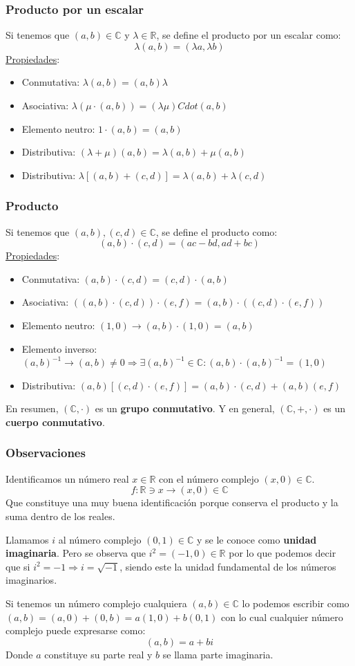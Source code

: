 \documentclass[10pt,a4paper,openright]{book}
\theoremstyle{break}
\begin{document}
\subsubsection{Producto por un escalar}
Si tenemos que $(a,b)\in \mathbb C$ y $\lambda\in \mathbb R$, se define el producto por un escalar como:
$$\lambda(a,b)=(\lambda a,\lambda b)$$
\underline{Propiedades}:
\begin{itemize}
\item Conmutativa: $\lambda(a,b)=(a,b)\lambda$
\item Asociativa: $\lambda(\mu \cdot (a,b))=(\lambda\mu)Cdot (a,b)$
\item Elemento neutro: $1\cdot (a,b)=(a,b)$
\item Distributiva: $(\lambda+\mu)(a,b)=\lambda (a,b)+\mu (a,b)$\par
\item Distributiva: $\lambda[(a,b)+(c,d)]=\lambda(a,b)+\lambda(c,d)$
\end{itemize}

\subsubsection{Producto}
Si tenemos que $(a,b),(c,d)\in \mathbb C$, se define el producto como:
$$(a,b)\cdot (c,d)=(ac-bd,ad+bc)$$
\underline{Propiedades}:
\begin{itemize}
\item Conmutativa: $(a,b)\cdot (c,d)=(c,d)\cdot (a,b)$
\item Asociativa: $\left((a,b)\cdot(c,d)\right)\cdot (e,f)=(a,b)\cdot \left((c,d)\cdot (e,f)\right)$
\item Elemento neutro: $(1,0)\rightarrow (a,b)\cdot (1,0)=(a,b)$
\item Elemento inverso: $(a,b)^{-1}\rightarrow (a,b)\neq 0\Rightarrow \exists (a,b)^{-1}\in \mathbb C: (a,b)\cdot (a,b)^{-1}=(1,0)$
\item Distributiva: $(a,b)[(c,d)\cdot(e,f)]=(a,b)\cdot (c,d)+(a,b)(e,f)$
\end{itemize}
En resumen, $(\mathbb C, \cdot)$ es un \textbf{grupo conmutativo}. Y en general, $(\mathbb C, + ,\cdot)$ es un \textbf{cuerpo conmutativo}.

\subsubsection{Observaciones}
Identificamos un número real $x\in \mathbb R$ con el número complejo $(x,0)\in \mathbb C$.
$$f: \mathbb R\ni x\rightarrow (x,0)\in \mathbb C$$
Que constituye una muy buena identificación porque conserva el producto y la suma dentro de los reales.\par
Llamamos $i$ al número complejo $(0,1)\in \mathbb C$ y se le conoce como \textbf{unidad imaginaria}. Pero se observa que $i^2=(-1,0)\in \mathbb R$ por lo que podemos decir que si $i^2=-1\Rightarrow i=\sqrt{-1}$, siendo este la unidad fundamental de los números imaginarios.\par
Si tenemos un número complejo cualquiera $(a,b)\in \mathbb C$ lo podemos escribir como $(a,b)=(a,0)+(0,b)=a(1,0)+b(0,1)$ con lo cual cualquier número complejo puede expresarse como:
$$(a,b)=a+bi$$
Donde $a$ constituye su parte real y $b$ se llama parte imaginaria.
\end{document}
